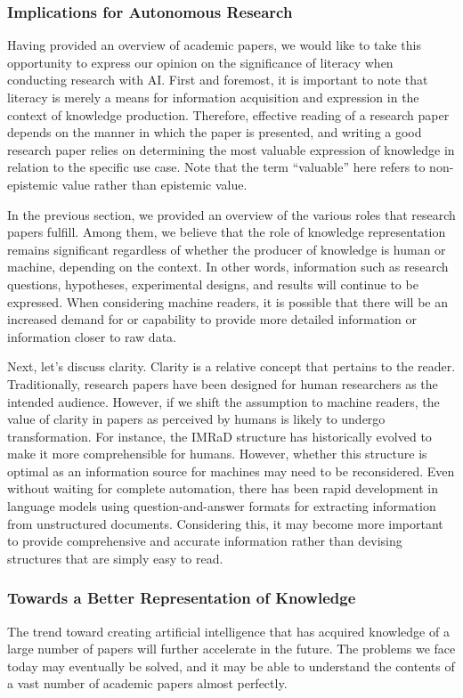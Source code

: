\documentclass{book}
\begin{document}
\subsubsection{Implications for Autonomous Research}
Having provided an overview of academic papers, we would like to take this opportunity to express our opinion on the significance of literacy when conducting research with AI. First and foremost, it is important to note that literacy is merely a means for information acquisition and expression in the context of knowledge production. Therefore, effective reading of a research paper depends on the manner in which the paper is presented, and writing a good research paper relies on determining the most valuable expression of knowledge in relation to the specific use case. Note that the term ``valuable'' here refers to non-epistemic value rather than epistemic value.

In the previous section, we provided an overview of the various roles that research papers fulfill. Among them, we believe that the role of knowledge representation remains significant regardless of whether the producer of knowledge is human or machine, depending on the context. In other words, information such as research questions, hypotheses, experimental designs, and results will continue to be expressed. When considering machine readers, it is possible that there will be an increased demand for or capability to provide more detailed information or information closer to raw data.

Next, let's discuss clarity. Clarity is a relative concept that pertains to the reader. Traditionally, research papers have been designed for human researchers as the intended audience. However, if we shift the assumption to machine readers, the value of clarity in papers as perceived by humans is likely to undergo transformation. For instance, the IMRaD structure has historically evolved to make it more comprehensible for humans. However, whether this structure is optimal as an information source for machines may need to be reconsidered. Even without waiting for complete automation, there has been rapid development in language models using question-and-answer formats for extracting information from unstructured documents. Considering this, it may become more important to provide comprehensive and accurate information rather than devising structures that are simply easy to read.

\subsubsection{Towards a Better Representation of Knowledge}
The trend toward creating artificial intelligence that has acquired knowledge of a large number of papers will further accelerate in the future. The problems we face today may eventually be solved, and it may be able to understand the contents of a vast number of academic papers almost perfectly. 
\end{document}
